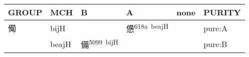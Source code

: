 \documentclass[14pt,a4paper]{scrartcl}
\begin{document}
\begin{longtable}[c]{@{}llllll@{}}
\toprule
\begin{minipage}[b]{0.14\columnwidth}\raggedright\strut
GROUP
\strut\end{minipage} &
\begin{minipage}[b]{0.14\columnwidth}\raggedright\strut
MCH
\strut\end{minipage} &
\begin{minipage}[b]{0.14\columnwidth}\raggedright\strut
B
\strut\end{minipage} &
\begin{minipage}[b]{0.14\columnwidth}\raggedright\strut
A
\strut\end{minipage} &
\begin{minipage}[b]{0.14\columnwidth}\raggedright\strut
none
\strut\end{minipage} &
\begin{minipage}[b]{0.14\columnwidth}\raggedright\strut
PURITY
\strut\end{minipage}\tabularnewline
\midrule
\endhead
\begin{minipage}[t]{0.14\columnwidth}\raggedright\strut
僃
\strut\end{minipage} &
\begin{minipage}[t]{0.14\columnwidth}\raggedright\strut
bijH
\strut\end{minipage} &
\begin{minipage}[t]{0.14\columnwidth}\raggedright\strut
\strut\end{minipage} &
\begin{minipage}[t]{0.14\columnwidth}\raggedright\strut
憊\textsuperscript{618a~beajH}
\strut\end{minipage} &
\begin{minipage}[t]{0.14\columnwidth}\raggedright\strut
\strut\end{minipage} &
\begin{minipage}[t]{0.14\columnwidth}\raggedright\strut
pure:A
\strut\end{minipage}\tabularnewline
\begin{minipage}[t]{0.14\columnwidth}\raggedright\strut
𤰈
\strut\end{minipage} &
\begin{minipage}[t]{0.14\columnwidth}\raggedright\strut
beajH
\strut\end{minipage} &
\begin{minipage}[t]{0.14\columnwidth}\raggedright\strut
備\textsuperscript{5099~bijH}
\strut\end{minipage} &
\begin{minipage}[t]{0.14\columnwidth}\raggedright\strut
\strut\end{minipage} &
\begin{minipage}[t]{0.14\columnwidth}\raggedright\strut
\strut\end{minipage} &
\begin{minipage}[t]{0.14\columnwidth}\raggedright\strut
pure:B
\strut\end{minipage}\tabularnewline
\bottomrule
\end{longtable}
\end{document}
